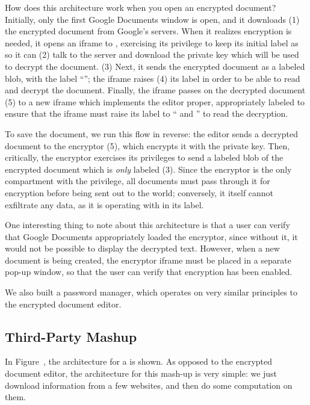 How does this architecture work when you open an encrypted document?  Initially, only the
first Google Documents window is open, and it downloads (1) the encrypted
document from Google's servers.  When it realizes encryption is needed,
it opens an iframe to , exercising its privilege to keep
its initial label as  so it can (2) talk to the 
server and download the private key which will be used to decrypt the
document.  (3) Next, it sends the encrypted document as a labeled blob,
with the label ``''; the iframe raises (4) its label in
order to be able to read and decrypt the document.  Finally, the iframe
passes on the decrypted document (5) to a new iframe which implements the
editor proper, appropriately labeled to ensure that the iframe must raise
its label to `` and '' to read the decryption.

To save the document, we run this flow in reverse: the editor sends a
decrypted document to the encryptor (5), which encrypts it with the
private key.  Then, critically, the encryptor exercises its privileges
to send a labeled blob of the encrypted document which is \emph{only}
labeled  (3).  Since the encryptor is the only compartment
with the  privilege, all documents must pass through it for
encryption before being sent out to the world; conversely, it itself cannot
exfiltrate any data, as it is operating with  in its label.

One interesting thing to note about this architecture is that a user can
verify that Google Documents appropriately loaded the encryptor, since
without it, it would not be possible to display the decrypted text.  However, when
a new document is being created, the encryptor iframe must be placed
in a separate pop-up window, so that the user can verify that encryption
has been enabled.

We also built a password manager, which operates on very similar
principles to the encrypted document editor. 

\subsection{Third-Party Mashup}
\label{sec:apps-mashup}


In Figure~, the architecture for a  is shown.  As opposed to the encrypted document editor,
the architecture for this mash-up is very simple: we just download
information from a few websites, and then do some computation on them.

